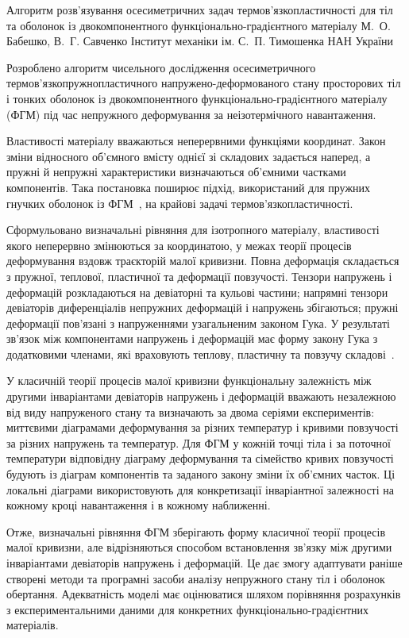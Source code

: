 \ReportHeading
  {Алгоритм розв’язування осесиметричних задач термов’язкопластичності для тіл та оболонок із двокомпонентного функціонально-градієнтного матеріалу}
  {М.~О. Бабешко, В.~Г. Савченко}
  {Інститут механіки ім. С.~П. Тимошенка НАН України}
  {}

Розроблено алгоритм чисельного дослідження осесиметричного термов’язкопружнопластичного напружено-деформованого стану просторових тіл і тонких оболонок із двокомпонентного функціонально-градієнтного матеріалу (ФГМ) під час непружного деформування за неізотермічного навантаження.

Властивості матеріалу вважаються неперервними функціями координат. Закон зміни відносного об’ємного вмісту однієї зі складових задається наперед, а пружні й непружні характеристики визначаються об’ємними частками компонентів. Така постановка поширює підхід, використаний для пружних гнучких оболонок із ФГМ~\cite{fgmtvp:sklepus2023}, на крайові задачі термов’язкопластичності.

Сформульовано визначальні рівняння для ізотропного матеріалу, властивості якого неперервно змінюються за координатою, у межах теорії процесів деформування вздовж траєкторій малої кривизни. Повна деформація складається з пружної, теплової, пластичної та деформації повзучості. Тензори напружень і деформацій розкладаються на девіаторні та кульові частини; напрямні тензори девіаторів диференціалів непружних деформацій і напружень збігаються; пружні деформації пов’язані з напруженнями узагальненим законом Гука. У результаті зв’язок між компонентами напружень і деформацій має форму закону Гука з додатковими членами, які враховують теплову, пластичну та повзучу складові~\cite{fgmtvp:shevchenko2016,fgmtvp:monograph1987}.

У класичній теорії процесів малої кривизни функціональну залежність між другими інваріантами девіаторів напружень і деформацій вважають незалежною від виду напруженого стану та визначають за двома серіями експериментів: миттєвими діаграмами деформування за різних температур і кривими повзучості за різних напружень та температур. Для ФГМ у кожній точці тіла і за поточної температури відповідну діаграму деформування та сімейство кривих повзучості будують із діаграм компонентів та заданого закону зміни їх об’ємних часток. Ці локальні діаграми використовують для конкретизації інваріантної залежності на кожному кроці навантаження і в кожному наближенні.

Отже, визначальні рівняння ФГМ зберігають форму класичної теорії процесів малої кривизни, але відрізняються способом встановлення зв’язку між другими інваріантами девіаторів напружень і деформацій. Це дає змогу адаптувати раніше створені методи та програмні засоби аналізу непружного стану тіл і оболонок обертання. Адекватність моделі має оцінюватися шляхом порівняння розрахунків з експериментальними даними для конкретних функціонально-градієнтних матеріалів.


